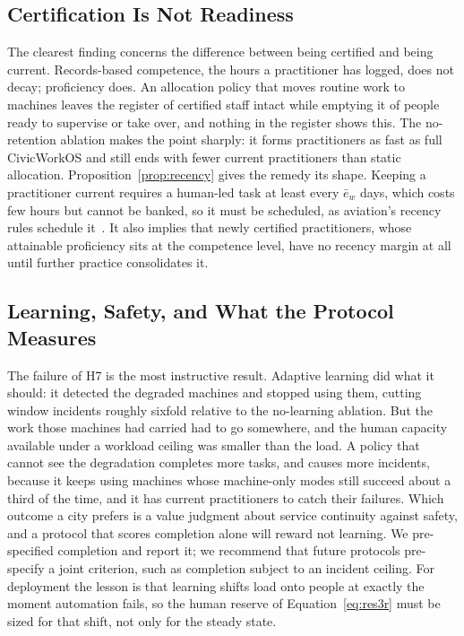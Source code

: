 \documentclass[utf8]{FrontiersinHarvard}
\begin{document}
	\subsection{Certification Is Not Readiness}
	\label{sec:readiness}

	The clearest finding concerns the difference between being certified and being current. Records-based competence, the hours a practitioner has logged, does not decay; proficiency does. An allocation policy that moves routine work to machines leaves the register of certified staff intact while emptying it of people ready to supervise or take over, and nothing in the register shows this. The no-retention ablation makes the point sharply: it forms practitioners as fast as full CivicWorkOS and still ends with fewer current practitioners than static allocation. Proposition~\ref{prop:recency} gives the remedy its shape. Keeping a practitioner current requires a human-led task at least every $\bar e_w$ days, which costs few hours but cannot be banked, so it must be scheduled, as aviation's recency rules schedule it~\citep{FAA6157}. It also implies that newly certified practitioners, whose attainable proficiency sits at the competence level, have no recency margin at all until further practice consolidates it.

	\subsection{Learning, Safety, and What the Protocol Measures}
	\label{sec:learningsafety}

	The failure of H7 is the most instructive result. Adaptive learning did what it should: it detected the degraded machines and stopped using them, cutting window incidents roughly sixfold relative to the no-learning ablation. But the work those machines had carried had to go somewhere, and the human capacity available under a workload ceiling was smaller than the load. A policy that cannot see the degradation completes more tasks, and causes more incidents, because it keeps using machines whose machine-only modes still succeed about a third of the time, and it has current practitioners to catch their failures. Which outcome a city prefers is a value judgment about service continuity against safety, and a protocol that scores completion alone will reward not learning. We pre-specified completion and report it; we recommend that future protocols pre-specify a joint criterion, such as completion subject to an incident ceiling. For deployment the lesson is that learning shifts load onto people at exactly the moment automation fails, so the human reserve of Equation~\eqref{eq:res3r} must be sized for that shift, not only for the steady state.
\end{document}
